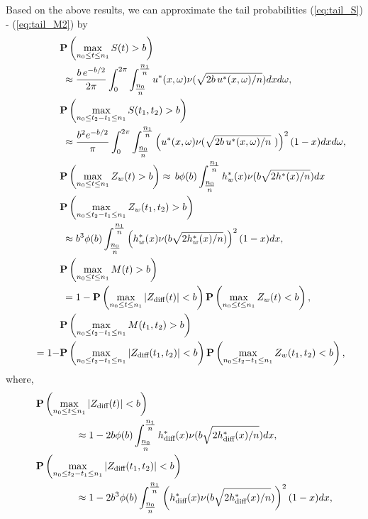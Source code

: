 \documentclass[arxiv, preprint]{imsart}
\numberwithin{equation}{section}
\theoremstyle{plain}
\begin{document}
Based on the above results, we can approximate the tail probabilities (\ref{eq:tail_S}) - (\ref{eq:tail_M2}) by
\begin{align}
& \mathbf{P} \left(\max_{n_0 \le t \le n_1} S(t) > b \right)  \label{eq:S_approx} \\
& \hspace{1mm}  \approx \frac{b\, e^{-b/2}}{2\pi} \int_{0}^{2 \pi} \int_{\tfrac{n_0}{n}}^{\tfrac{n_1}{n}}    u^*(x,\omega) \nu (\sqrt{2 b \, u^*(x,\omega)/n}) dx d \omega, \nonumber \\
& \mathbf{P} \left (\max_{n_0 \le t_2 - t_1 \le n_1} S(t_1, t_2) > b \right)  \label{eq:S2_approx} \\
&  \hspace{1mm} \approx \frac{b^2 e^{-b/2}}{\pi} \int_{0}^{2 \pi} \int_{\tfrac{n_0}{n}}^{\tfrac{n_1}{n}} \left( u^*(x,\omega)   \nu(\sqrt{2b \, u^*(x,\omega)/n}\, \, ) \right)^2 (1-x) dx d\omega, \nonumber \\
& \mathbf{P}\left(\max_{n_0 \le t \le n_1} Z_w(t) > b\right) \approx \, b \phi(b) \int_{\tfrac{n_0}{n}}^{\tfrac{n_1}{n}} h_w^*(x) \nu (b \sqrt{2h^*(x)/n})dx \label{eq:Zw_approx} \\
& \mathbf{P} \left(\max_{n_0 \le t_2 -t_1 \le n_1} Z_w(t_1,t_2) > b \right) \label{eq:Zw2_approx} \\
& \hspace{1mm}  \approx b^3 \phi(b) \int_{\tfrac{n_0}{n}}^{\tfrac{n_1}{n}} \left( h_w^*(x) \nu (b \sqrt{2h_w^*(x)/n}) \right ) ^2 (1-x)dx, \nonumber \\
& \mathbf{P} \left(\max_{n_0 \le t \le n_1} M(t) > b \right) \label{eq:M_approx}\\
& \hspace{1mm} = 1 - \mathbf{P} \left( \max_{n_0 \le t \le n_1} |Z_\text{diff}(t)| < b \right) \mathbf{P} \left( \max_{n_0 \le t \le n_1} Z_w(t) < b \right), \nonumber\\ 
& \mathbf{P} \left( \max_{n_0 \le t_2 -t_1 \le n_1} M(t_1,t_2) > b \right)   \label{eq:M2_approx}\\
\hspace{5mm} = 1 - &  \mathbf{P} \left( \max_{n_0 \le t_2 -t_1 \le n_1} |Z_\text{diff} (t_1,t_2)| < b \right) \mathbf{P} \left( \max_{n_0 \le t_2 -t_1 \le n_1} Z_w(t_1,t_2) < b \right), \nonumber
\end{align}
where,
\begin{align}
& \boldP \left(\max_{n_0 \le t \le n_1} |Z_\text{diff}(t)| < b \right) \label{eq:Zdiff_approx} \\
&\hspace{14mm} \approx 1-2b \phi(b) \int_{\tfrac{n_0}{n}}^{\tfrac{n_1}{n}} h^*_\text{diff}(x) \nu (b \sqrt{2 h^*_\text{diff}(x)/n}) dx, \nonumber \\
& \boldP \left(\max_{n_0 \le t_2 -t_1 \le n_1} |Z_\text{diff}(t_1,t_2)| < b \right)  \label{eq:Zdiff2_approx} \\
& \hspace{14mm} \approx 1- 2b^3 \phi(b) \int_{\tfrac{n_0}{n}}^{\tfrac{n_1}{n}} \left( h_\text{diff}^*(x) \nu (b \sqrt{2h_\text{diff}^*(x)/n}) \right ) ^2 (1-x)dx, \nonumber 
\end{align}
\end{document}
